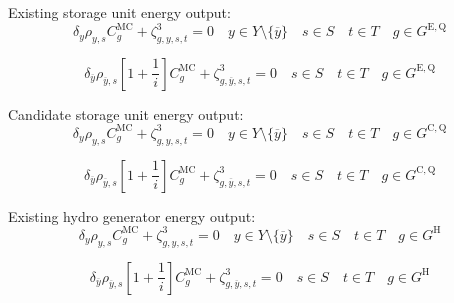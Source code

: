 \documentclass{article}
\newcommand{\sGeneratorsHydro}{G^{\mathrm{H}}}
\newcommand{\sStorageExisting}{G^{\mathrm{E,Q}}}
\newcommand{\sStorageCandidate}{G^{\mathrm{C,Q}}}
\newcommand{\sYears}{Y}
\newcommand{\sScenarios}{S}
\newcommand{\sIntervals}{T}
\newcommand{\iGenerator}{g}
\newcommand{\iYear}{y}
\newcommand{\iYearTerminal}{\overline{\iYear}}
\newcommand{\iScenario}{s}
\newcommand{\iInterval}{t}
\newcommand{\cScenarioDuration}[1][\iYear,\iScenario]{\rho_{#1}}
\newcommand{\cMarginalCost}[1][\iGenerator,\iYear]{C^{\mathrm{MC}}_{#1}}
\newcommand{\cInterestRate}{i}
\newcommand{\cDiscountRate}[1][\iYear]{\delta_{#1}}
\newcommand{\dStorageEnergyOutput}[1][\iGenerator,\iYear,\iScenario,\iInterval]{\zeta_{#1}^{3}}
\begin{document}
Existing storage unit energy output:
\begin{equation}
\cDiscountRate\cScenarioDuration \cMarginalCost[\iGenerator] + \dStorageEnergyOutput = 0 \quad \iYear \in \sYears \setminus \{\iYearTerminal\} \quad \iScenario \in \sScenarios \quad \iInterval \in \sIntervals \quad  \iGenerator \in \sStorageExisting
\end{equation}

\begin{equation}
\cDiscountRate[\iYearTerminal] \cScenarioDuration[\iYearTerminal,\iScenario] \left[1 + \frac{1}{\cInterestRate}\right] \cMarginalCost[\iGenerator] + \dStorageEnergyOutput[\iGenerator,\iYearTerminal,\iScenario,\iInterval] = 0 \quad \iScenario \in \sScenarios \quad \iInterval \in \sIntervals \quad  \iGenerator \in \sStorageExisting
\end{equation}

Candidate storage unit energy output:
\begin{equation}
\cDiscountRate\cScenarioDuration \cMarginalCost[\iGenerator] + \dStorageEnergyOutput = 0 \quad \iYear \in \sYears \setminus \{\iYearTerminal\} \quad \iScenario \in \sScenarios \quad \iInterval \in \sIntervals \quad  \iGenerator \in \sStorageCandidate
\end{equation}

\begin{equation}
\cDiscountRate[\iYearTerminal] \cScenarioDuration[\iYearTerminal,\iScenario] \left[1 + \frac{1}{\cInterestRate}\right] \cMarginalCost[\iGenerator] + \dStorageEnergyOutput[\iGenerator, \iYearTerminal,\iScenario,\iInterval] = 0 \quad \iScenario \in \sScenarios \quad \iInterval \in \sIntervals \quad  \iGenerator \in \sStorageCandidate
\end{equation}

Existing hydro generator energy output:
\begin{equation}
\cDiscountRate\cScenarioDuration \cMarginalCost[\iGenerator] + \dStorageEnergyOutput = 0 \quad \iYear \in \sYears \setminus \{\iYearTerminal\} \quad \iScenario \in \sScenarios \quad \iInterval \in \sIntervals \quad \iGenerator \in \sGeneratorsHydro
\end{equation}

\begin{equation}
\cDiscountRate[\iYearTerminal] \cScenarioDuration[\iYearTerminal,\iScenario] \left[1 + \frac{1}{\cInterestRate}\right] \cMarginalCost[\iGenerator] + \dStorageEnergyOutput[\iGenerator,\iYearTerminal,\iScenario,\iInterval] = 0 \quad \iScenario \in \sScenarios \quad \iInterval \in \sIntervals \quad \iGenerator \in \sGeneratorsHydro
\end{equation}
\end{document}
